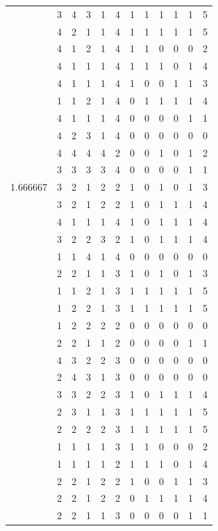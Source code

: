 \documentclass[]{book}
\theoremstyle{definition}
\theoremstyle{definition}
\theoremstyle{definition}
\theoremstyle{remark}
\begin{document}
\begin{table}
{\begin{tabular}[t]{rrrrrrrrrrrr}
 & 3 & 4 & 3 & 1 & 4 & 1 & 1 & 1 & 1 & 1 & 5\\
 & 4 & 2 & 1 & 1 & 4 & 1 & 1 & 1 & 1 & 1 & 5\\
 & 4 & 1 & 2 & 1 & 4 & 1 & 1 & 0 & 0 & 0 & 2\\
 & 4 & 1 & 1 & 1 & 4 & 1 & 1 & 1 & 0 & 1 & 4\\
 & 4 & 1 & 1 & 1 & 4 & 1 & 0 & 0 & 1 & 1 & 3\\
 & 1 & 1 & 2 & 1 & 4 & 0 & 1 & 1 & 1 & 1 & 4\\
 & 4 & 1 & 1 & 1 & 4 & 0 & 0 & 0 & 0 & 1 & 1\\
 & 4 & 2 & 3 & 1 & 4 & 0 & 0 & 0 & 0 & 0 & 0\\
 & 4 & 4 & 4 & 4 & 2 & 0 & 0 & 1 & 0 & 1 & 2\\
 & 3 & 3 & 3 & 3 & 4 & 0 & 0 & 0 & 0 & 1 & 1\\
1.666667 & 3 & 2 & 1 & 2 & 2 & 1 & 0 & 1 & 0 & 1 & 3\\
 & 3 & 2 & 1 & 2 & 2 & 1 & 0 & 1 & 1 & 1 & 4\\
 & 4 & 1 & 1 & 1 & 4 & 1 & 0 & 1 & 1 & 1 & 4\\
 & 3 & 2 & 2 & 3 & 2 & 1 & 0 & 1 & 1 & 1 & 4\\
 & 1 & 1 & 4 & 1 & 4 & 0 & 0 & 0 & 0 & 0 & 0\\
 & 2 & 2 & 1 & 1 & 3 & 1 & 0 & 1 & 0 & 1 & 3\\
 & 1 & 1 & 2 & 1 & 3 & 1 & 1 & 1 & 1 & 1 & 5\\
 & 1 & 2 & 2 & 1 & 3 & 1 & 1 & 1 & 1 & 1 & 5\\
 & 1 & 2 & 2 & 2 & 2 & 0 & 0 & 0 & 0 & 0 & 0\\
 & 2 & 2 & 1 & 1 & 2 & 0 & 0 & 0 & 0 & 1 & 1\\
 & 4 & 3 & 2 & 2 & 3 & 0 & 0 & 0 & 0 & 0 & 0\\
 & 2 & 4 & 3 & 1 & 3 & 0 & 0 & 0 & 0 & 0 & 0\\
 & 3 & 3 & 2 & 2 & 3 & 1 & 0 & 1 & 1 & 1 & 4\\
 & 2 & 3 & 1 & 1 & 3 & 1 & 1 & 1 & 1 & 1 & 5\\
 & 2 & 2 & 2 & 2 & 3 & 1 & 1 & 1 & 1 & 1 & 5\\
 & 1 & 1 & 1 & 1 & 3 & 1 & 1 & 0 & 0 & 0 & 2\\
 & 1 & 1 & 1 & 1 & 2 & 1 & 1 & 1 & 0 & 1 & 4\\
 & 2 & 2 & 1 & 2 & 2 & 1 & 0 & 0 & 1 & 1 & 3\\
 & 2 & 2 & 1 & 2 & 2 & 0 & 1 & 1 & 1 & 1 & 4\\
 & 2 & 2 & 1 & 1 & 3 & 0 & 0 & 0 & 0 & 1 & 1\\

\end{tabular}}
\end{table}
\end{document}
